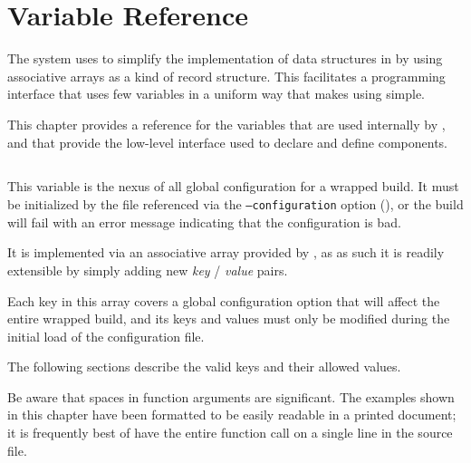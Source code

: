 %
%
%
%
\chapter{Variable Reference}

The \lmsbw system uses \gmsl to simplify the implementation of data
structures in \make by using associative arrays as a kind of record
structure.  This facilitates a programming interface that uses few
variables in a uniform way that makes using \lmsbw simple.

This chapter provides a reference for the variables that are used
internally by \lmsbw, and that provide the low-level interface used to
declare and define components.

\section{\lmsbwconfiguration}

This variable is the nexus of all global configuration for a wrapped
build.  It must be initialized by the file referenced via the \lmsbw
\texttt{--configuration} option (), or the
build will fail with an error message indicating that the
configuration is bad.

It is implemented via an associative array provided by \gmsl, as as
such it is readily extensible by simply adding new \emph{key} /
\emph{value} pairs.

Each key in this array covers a global configuration option that will
affect the entire wrapped build, and its keys and values must only be
modified during the initial load of the configuration file.

The following sections describe the valid keys and their allowed
values.

Be aware that spaces in \gnumake function arguments are significant.
The examples shown in this chapter have been formatted to be easily
readable in a printed document; it is frequently best of have the
entire function call on a single line in the source file.

